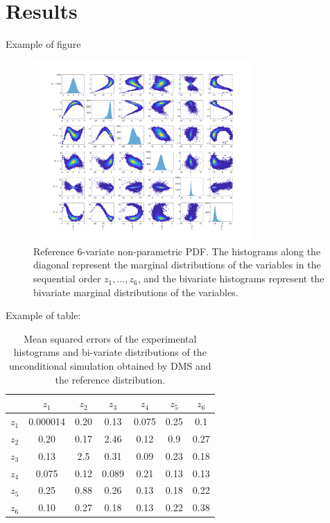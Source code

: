 \documentclass[a4paper,fleqn]{cas-sc}
\begin{document}
\section{Results}


Example of figure

\begin{figure}
\centering
\includegraphics[width=0.75\textwidth]{figs_rev1/uncond_distribution_reference.png}
\caption{ Reference 6-variate non-parametric PDF. The histograms along the diagonal represent the marginal distributions of the variables in the sequential order $z_1,...,z_6$, and the bivariate histograms represent the bivariate marginal distributions of the variables. }
\label{fig:uncond_distribution_reference}
\end{figure}

Example of table:

\begin{table}
\centering
\caption{Mean squared errors of the experimental histograms and bi-variate distributions of the unconditional simulation obtained by DMS and the reference distribution.}
\label{tab:dms}
\begin{tabular}{ |c||c|c|c|c|c|c| } 
 \hline
     & $z_1$  &  $z_2$  &  $z_3$  &  $z_4$  &  $z_5$  &   $z_6$\\ 
 \hline 
 \hline
$z_1$ & 0.000014 &  0.20    &   0.13   &  0.075  &  0.25    &	0.1 \\
\hline
$z_2$ & 0.20    &   0.17    &   2.46   &   0.12  &  0.9	    &   0.27 \\
\hline
$z_3$ & 0.13    &   2.5     &   0.31   &  0.09   &	0.23    &   0.18\\
\hline 
$z_4$ & 0.075   &	0.12    &  0.089   &  0.21   &   0.13   &   0.13\\
\hline
$z_5$ & 0.25    &   0.88    &   0.26   &  0.13   &   0.18   &   0.22\\
\hline
$z_6$ & 0.10    &   0.27    &   0.18   &  0.13   &   0.22   &   0.38\\
\hline
\end{tabular} 
\end{table}
\end{document}
